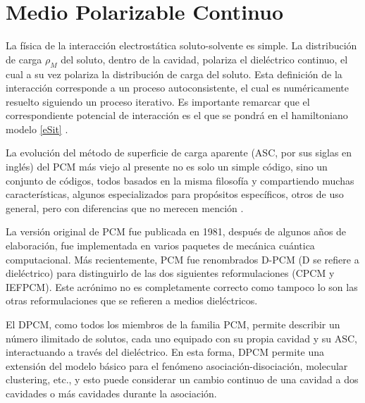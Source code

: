 \section{Medio Polarizable Continuo}
La f\'isica de la interacci\'on electrost\'atica soluto-solvente es 
simple. La distribuci\'on de carga $\rho_M$ del soluto, dentro de la
cavidad, polariza el diel\'ectrico continuo, el cual a su vez 
polariza la distribuci\'on de carga del soluto. Esta definici\'on de
la interacci\'on corresponde a un proceso autoconsistente, el cual 
es num\'ericamente resuelto siguiendo un proceso iterativo. Es 
importante remarcar que el correspondiente potencial de interacci\'on
es el que se pondr\'a en el hamiltoniano modelo \ref{eSit} 
\citep{Toma2005}.

La evoluci\'on del m\'etodo de superficie de carga aparente (ASC, por
sus siglas en ingl\'es) del PCM m\'as viejo al presente no es solo un
simple c\'odigo, sino un conjunto de c\'odigos, todos basados en la 
misma filosof\'ia y compartiendo muchas caracter\'isticas, algunos
especializados para prop\'ositos espec\'ificos, otros de uso general,
pero con diferencias que no merecen menci\'on \citep{Toma2005}.

La versi\'on original de PCM fue publicada en 1981, despu\'es de 
algunos a\~nos de elaboraci\'on, fue implementada en varios paquetes
de mec\'anica cu\'antica computacional. M\'as recientemente, PCM fue
renombrados D-PCM (D se refiere a diel\'ectrico) para distinguirlo de
las dos siguientes reformulaciones (CPCM y IEFPCM). Este acr\'onimo 
no es completamente correcto como tampoco lo son las otras 
reformulaciones que se refieren a medios diel\'ectricos. 

El DPCM, como todos los miembros de la familia PCM, permite describir
un n\'umero ilimitado de solutos, cada uno equipado con su propia 
cavidad y su ASC, interactuando a trav\'es del diel\'ectrico. En esta
forma, DPCM permite una extensi\'on del modelo b\'asico para el 
fen\'omeno asociaci\'on-disociaci\'on, molecular clustering, etc., y 
esto puede considerar un cambio continuo de una cavidad a dos 
cavidades o m\'as cavidades durante la asociaci\'on.

